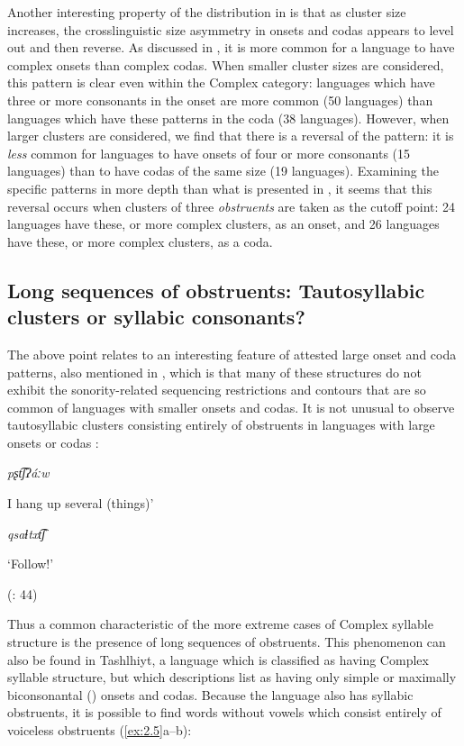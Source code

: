   Another interesting property of the distribution in  is that as cluster size increases, the crosslinguistic size asymmetry in onsets and codas appears to level out and then reverse. As discussed in , it is more common for a language to have complex onsets than complex codas. When smaller cluster sizes are considered, this pattern is clear even within the Complex category: languages which have three or more consonants in the onset are more common (50 languages) than languages which have these patterns in the coda (38 languages). However, when larger clusters are considered, we find that there is a reversal of the pattern: it is \textit{less} common for languages to have onsets of four or more consonants (15 languages) than to have codas of the same size (19 languages). Examining the specific patterns in more depth than what is presented in , it seems that this reversal occurs when clusters of three \textit{obstruents} are taken as the cutoff point: 24 languages have these, or more complex clusters, as an onset, and 26 languages have these, or more complex clusters, as a coda.

\subsection{Long sequences of obstruents: Tautosyllabic clusters or syllabic consonants?}\label{sec:2.2.1}

  The above point relates to an interesting feature of attested large onset and coda patterns, also mentioned in , which is that many of these structures do not exhibit the sonority-related sequencing restrictions and contours that are so common of languages with smaller onsets and codas. It is not unusual to observe tautosyllabic clusters consisting entirely of obstruents in languages with large onsets or codas :

\ea\label{ex:2.3}

  \textit{pʂt͡ʃʔáːw}

  I hang up several (things)’

  \citep[36]{Crawford1966}
\z

\ea\label{ex:2.4}

  \textit{qsaɬtxt͡ʃ}

  ‘Follow!’

  (\citealt{GeorgVolodin1999}: 44)
\z

  Thus a common characteristic of the more extreme cases of Complex syllable structure is the presence of long sequences of obstruents. This phenomenon can also be found in Tashlhiyt, a language which is classified as having Complex syllable structure, but which descriptions list as having only simple \citep{Ridouane2008} or maximally biconsonantal (\citealt{PuechLouali1999}) onsets and codas. Because the language also has syllabic obstruents, it is possible to find words without vowels which consist entirely of voiceless obstruents (\ref{ex:2.5}a--b):

